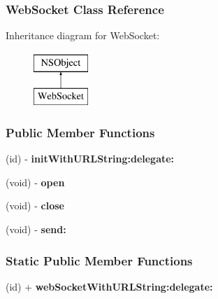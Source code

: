 \hypertarget{interface_web_socket}{
\subsubsection{WebSocket Class Reference}
\label{interface_web_socket}
}
Inheritance diagram for WebSocket:\begin{figure}[h]
\begin{center}
\leavevmode
\includegraphics[height=2.000000cm]{interface_web_socket}
\end{center}
\end{figure}
\subsubsection*{Public Member Functions}
\begin{DoxyCompactItemize}
\item 
\hypertarget{interface_web_socket_afaa09a19e233e0f0e705d2f3dc2ea341}{
(id) -\/ {\bfseries initWithURLString:delegate:}}
\label{interface_web_socket_afaa09a19e233e0f0e705d2f3dc2ea341}

\item 
\hypertarget{interface_web_socket_a69888e3dafbdbf4750ea35e3565aac86}{
(void) -\/ {\bfseries open}}
\label{interface_web_socket_a69888e3dafbdbf4750ea35e3565aac86}

\item 
\hypertarget{interface_web_socket_abef10acf60b4d5b87399e6f9c5ad808d}{
(void) -\/ {\bfseries close}}
\label{interface_web_socket_abef10acf60b4d5b87399e6f9c5ad808d}

\item 
\hypertarget{interface_web_socket_ad535acd310f8708b8c3f898c1a4a08bd}{
(void) -\/ {\bfseries send:}}
\label{interface_web_socket_ad535acd310f8708b8c3f898c1a4a08bd}

\end{DoxyCompactItemize}
\subsubsection*{Static Public Member Functions}
\begin{DoxyCompactItemize}
\item 
\hypertarget{interface_web_socket_ada7a6583a8bc51b20c1652935c14195a}{
(id) + {\bfseries webSocketWithURLString:delegate:}}
\label{interface_web_socket_ada7a6583a8bc51b20c1652935c14195a}

\end{DoxyCompactItemize}
